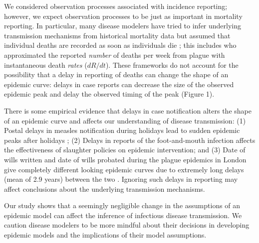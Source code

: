 \documentclass{article}\usepackage[]{graphicx}\usepackage[]{color}
\begin{document}
We considered observation processes associated with incidence 
reporting; however, we expect observation processes to be just as important
in mortality reporting. In particular, many disease modelers have
tried to infer underlying transmission mechanisms from historical mortality 
data but assumed that individual deaths are recorded as soon as individuals die 
\citep{he2013inferring, didelot2017model, dean2018human}; this includes
\cite{kermack1927contribution} who approximated the reported \emph{number} of
deaths per week from plague with instantaneous death \emph{rates} ($dR/dt$).
These frameworks do not account for the possibility 
that a delay in reporting of deaths can
change the shape of an epidemic curve: delays in case reports can decrease
the size of the observed epidemic peak and delay the observed timing of the peak (Figure 1). 

There is some empirical evidence that delays in case notification alters the
shape of an epidemic curve and affects our understanding of disease transmission:
(1) Postal delays in measles notification during holidays lead to sudden
epidemic peaks after holidays \citep{fine1982measles}; 
(2) Delays in reports of the foot-and-mouth infection affects the effectiveness
of slaughter policies on epidemic intervention;
and (3) Date of wills written and date of wills probated during
the plague epidemics in London give completely different looking epidemic curves
due to extremely long delays (mean of 2.9 years) between the two \citep{bushby2019wills}.
Ignoring such delays in reporting may affect conclusions about the underlying 
transmission mechanisms.

Our study shows that a seemingly negligible change in the assumptions of an epidemic
model can affect the inference of infectious disease transmission.
We caution disease modelers to be more mindful about their decisions in developing
epidemic models and the implications of their model assumptions.


\end{document}
